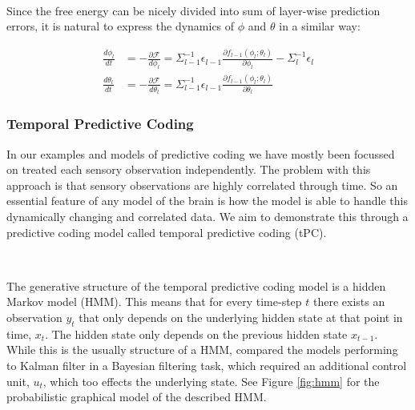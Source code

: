 \documentclass{article}
\begin{document}
\

Since the free energy can be nicely divided into sum of layer-wise prediction errors, it is natural to express the dynamics of $\phi$ and $\theta$ in a similar way:

\begin{equation}
	\begin{aligned}
		\frac{d\phi_l}{dt} &= - \frac{\partial \mathcal{F}}{d\phi_l} = \Sigma_{l - 1}^{- 1} \epsilon_{l - 1} \frac{\partial f_{l - 1}(\phi_{l}; \theta_{l})}{\partial \phi_{l}} - \Sigma_{l}^{-1} \epsilon_l \\
		\frac{d\theta_l}{dt} &= - \frac{\partial \mathcal{F}}{d\theta_l} = \Sigma_{l - 1}^{- 1} \epsilon_{l - 1} \frac{\partial f_{l - 1}(\phi_{l}; \theta_{l})}{\partial \theta_{l}}
	\end{aligned}
\end{equation}

\subsubsection{Temporal Predictive Coding}

In our examples and models of predictive coding we have mostly been focussed on treated each sensory observation independently. The problem with this approach is that sensory observations are highly correlated through time. So an essential feature of any model of the brain is how the model is able to handle this dynamically changing and correlated data. We aim to demonstrate this through a predictive coding model called temporal predictive coding (tPC). 

\

The generative structure of the temporal predictive coding model is a hidden Markov model (HMM). This means that for every time-step $t$ there exists an observation $y_t$ that only depends on the underlying hidden state at that point in time, $x_t$. The hidden state only depends on the previous hidden state $x_{t-1}$. While this is the usually structure of a HMM, \citet{millidge2024temporal} compared the models performing to Kalman filter in a Bayesian filtering task, which required an additional control unit, $u_t$, which too effects the underlying state. See Figure \ref{fig:hmm} for the probabilistic graphical model of the described HMM. 

\
\end{document}
